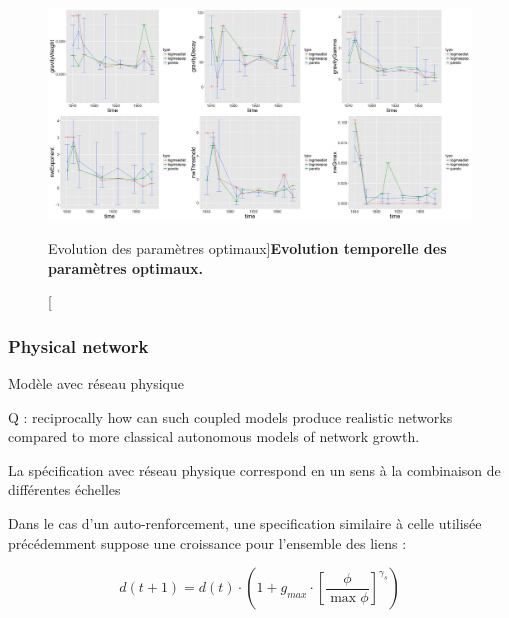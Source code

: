 \begin{figure}
	\includegraphics[width=\linewidth]{Figures/Final/6-2-3-fig-macrocoevol-parameters.jpg}
	\caption[][Evolution des paramètres optimaux]{\label{fig:macrocoevol:parameters}}{\textbf{Evolution temporelle des paramètres optimaux.}\label{fig:macrocoevol:parameters}}
\end{figure}








\subsubsection{Physical network}{Modèle avec réseau physique}



Q : reciprocally how can such coupled models produce realistic networks compared to more classical autonomous models of network growth.

La spécification avec réseau physique correspond en un sens à la combinaison de différentes échelles



Dans le cas d'un auto-renforcement, une specification similaire à celle utilisée précédemment suppose une croissance pour l'ensemble des liens :

\[
d(t+1) = d(t)\cdot \left(1 + g_{max} \cdot \left[\frac{\phi}{\max \phi}\right]^{\gamma_s}\right)
\]

